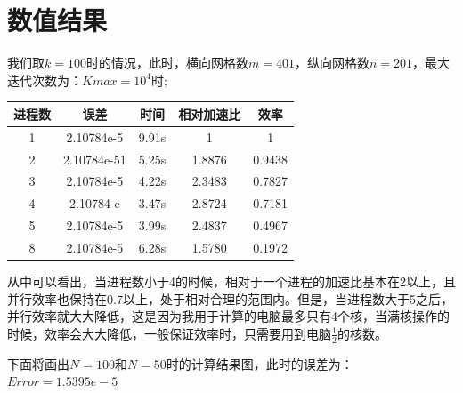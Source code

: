 \documentclass[a4paper,11pt]{ctexart} %
\begin{document}
\section{数值结果}
我们取$k=100$时的情况，此时，横向网格数$m=401$，纵向网格数$n=201$，最大迭代次数为：$Kmax=10^4$时;\par
\begin{table}[h]
\centering
\begin{tabular}{|c|c|c|c|c|}
\hline
进程数 &误差 &时间 &相对加速比 &效率  \\
\hline
1 &2.10784e-5  &9.91s   &1   &1  \\
\hline
2 &2.10784e-51 &5.25s   &1.8876  & 0.9438   \\
\hline
3 &2.10784e-5  &4.22s  &2.3483   &0.7827 \\
\hline
4 &2.10784-e   &3.47s   &2.8724   & 0.7181     \\
\hline
5 &2.10784e-5   &3.99s   &2.4837   &0.4967   \\
\hline
8 &2.10784e-5   &6.28s    &1.5780  &0.1972  \\
\hline
\end{tabular}
\end{table}
\newpage
从中可以看出，当进程数小于4的时候，相对于一个进程的加速比基本在2以上，且并行效率也保持在0.7以上，处于相对合理的范围内。但是，当进程数大于5之后，并行效率就大大降低，这是因为我用于计算的电脑最多只有4个核，当满核操作的时候，效率会大大降低，一般保证效率时，只需要用到电脑$\frac{1}{2}$的核数。\par
\par
下面将画出$N=100$和$N=50$时的计算结果图，此时的误差为：$Error=1.5395e-5$ \par
\par
\end{document}
